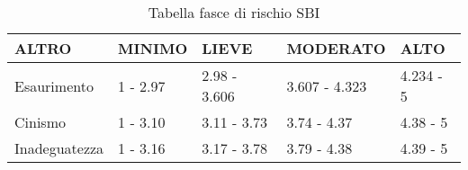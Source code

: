 \begin{table}[h!]
\bigskip
\begin{center}
\begin{tabular}{| m{80pt} | M{60pt} | M{60pt} | M{90pt} | M{60pt} |}
 \hline
 \textbf{ALTRO} & \textbf{MINIMO} & \textbf{LIEVE} & \textbf{MODERATO} & \textbf{ALTO} \\
 \hline
  Esaurimento&  1 - 2.97 &  2.98 - 3.606 &  3.607 - 4.323 &  4.234 - 5 \\
 \hline
  Cinismo&  1 - 3.10 &  3.11 - 3.73 &  3.74 - 4.37 &  4.38 - 5 \\
 \hline
  Inadeguatezza&  1 - 3.16 &  3.17 - 3.78 &  3.79 - 4.38 &  4.39 - 5 \\
 \hline
\end{tabular}
\end{center}
\caption{Tabella fasce di rischio SBI}
\label{table:sbi}
\end{table}